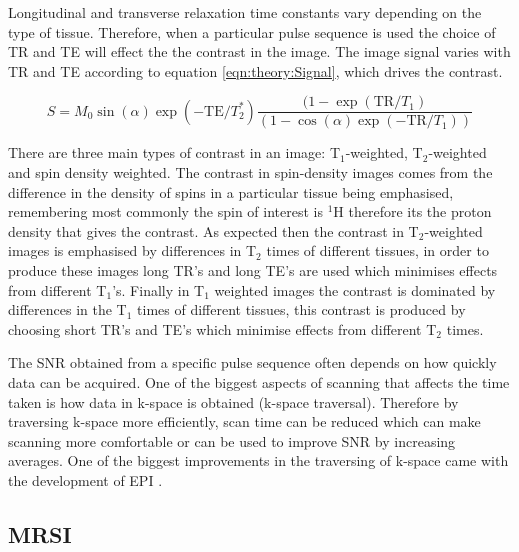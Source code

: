 Longitudinal and transverse relaxation time constants vary depending on the type of tissue. Therefore, when a particular pulse sequence is used the choice of \ac{TR} and \ac{TE} will effect the the contrast in the image. The image signal varies with \ac{TR} and \ac{TE} according to equation \ref{eqn:theory:Signal}, which drives the contrast.

\begin{equation}
    S = M_0\sin(\alpha)\exp(-\textrm{TE}/T_2^*)\frac{(1-\exp(\textrm{TR}/T_1)}{(1-\cos(\alpha)\exp(-\textrm{TR}/T_1))}
    \label{eqn:theory:Signal}
\end{equation}

\noindent There are three main types of contrast in an image: T$_1$-weighted, T$_2$-weighted and spin density weighted. The contrast in spin-density images comes from the difference in the density of spins in a particular tissue being emphasised, remembering most commonly the spin of interest is $^1$H therefore its the proton density that gives the contrast. As expected then the contrast in T$_2$-weighted images is emphasised by differences in T$_2$ times of different tissues, in order to produce these images long \ac{TR}'s and long \ac{TE}'s are used which minimises effects from different T$_1$'s. Finally in T$_1$ weighted images the contrast is dominated by differences in the T$_1$ times of different tissues, this contrast is produced by choosing short \ac{TR}'s and \ac{TE}'s which minimise effects from different T$_2$ times. 

The \ac{SNR} obtained from a specific pulse sequence often depends on how quickly data can be acquired. One of the biggest aspects of scanning that affects the time taken is how data in k-space is obtained (k-space traversal). Therefore by traversing k-space more efficiently, scan time can be reduced which can make scanning more comfortable or can be used to improve \ac{SNR} by increasing averages. One of the biggest improvements in the traversing of k-space came with the development of \ac{EPI} \cite{Stehling1991Echo-planarSecond}.

\subsection{MRSI}

